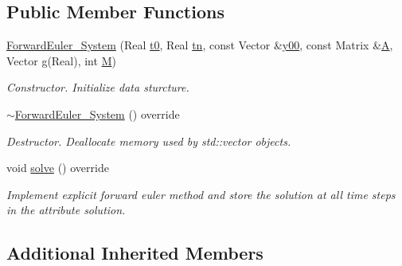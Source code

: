 \subsection*{Public Member Functions}
\begin{DoxyCompactItemize}
\item 
\mbox{\label{class_forward_euler___system_aafa4f24d552bc1224326d4006315bb21}} 
\mbox{\hyperlink{class_forward_euler___system_aafa4f24d552bc1224326d4006315bb21}{Forward\+Euler\+\_\+\+System}} (Real \mbox{\hyperlink{class_o_d_e___system_a1947b357608babc98c5e79d645e24c3c}{t0}}, Real \mbox{\hyperlink{class_o_d_e___system_a5c5a0dd9f04dfb8d8a84d49b741773af}{tn}}, const Vector \&\mbox{\hyperlink{class_o_d_e___system_a1379137a4480e5861fd1911bc061f908}{y00}}, const Matrix \&\mbox{\hyperlink{class_o_d_e___system_a632009677e80b62a1996e842398bf8b6}{A}}, Vector \mbox{\hyperlink{class_o_d_e___system_a5a294fda765e6cbfd7dfda43755d2c55}{g}}(Real), int \mbox{\hyperlink{class_o_d_e___system_a46e5ee402ffc7c500dccad753a1fba36}{M}})
\begin{DoxyCompactList}\small\item\em Constructor. Initialize data sturcture. \end{DoxyCompactList}\item 
\mbox{\label{class_forward_euler___system_a97a3dd10d62f962b537ac616e84463a5}} 
\mbox{\hyperlink{class_forward_euler___system_a97a3dd10d62f962b537ac616e84463a5}{$\sim$\+Forward\+Euler\+\_\+\+System}} () override
\begin{DoxyCompactList}\small\item\em Destructor. Deallocate memory used by std\+::vector objects. \end{DoxyCompactList}\item 
void \mbox{\hyperlink{class_forward_euler___system_a336f60f3804df3323a4729f9ff380b65}{solve}} () override
\begin{DoxyCompactList}\small\item\em Implement explicit forward euler method and store the solution at all time steps in the attribute solution. \end{DoxyCompactList}\end{DoxyCompactItemize}
\subsection*{Additional Inherited Members}


